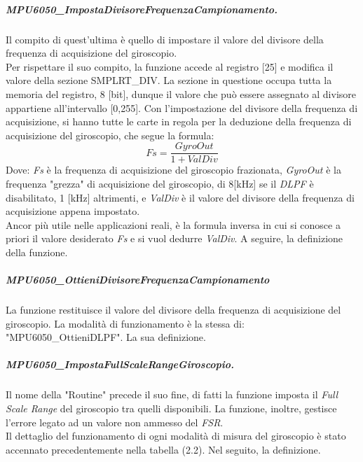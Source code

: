 \documentclass[11pt]{report}
\begin{document}
\subparagraph{MPU6050\_ImpostaDivisoreFrequenzaCampionamento.}
Il compito di quest'ultima è quello di impostare il valore del divisore della frequenza di acquisizione del giroscopio.\\
Per rispettare il suo compito, la funzione accede al registro [25] e modifica il valore della sezione SMPLRT\_DIV. La sezione in questione occupa tutta la memoria del registro, 8 [bit], dunque il valore che può essere assegnato al divisore appartiene all'intervallo [0,255].
Con l'impostazione del divisore della frequenza di acquisizione, si hanno tutte le carte in regola per la deduzione della frequenza di acquisizione del giroscopio, che segue la formula:
\begin{equation}
    Fs = \frac{GyroOut}{1 + ValDiv}
\end{equation}
Dove: \textit{Fs} è la frequenza di acquisizione del giroscopio frazionata, \textit{GyroOut} è la frequenza "grezza" di acquisizione del giroscopio, di 8[kHz] se il \textit{DLPF} è disabilitato, 1 [kHz] altrimenti, e \textit{ValDiv} è il valore del divisore della frequenza di acquisizione appena impostato.\\
Ancor più utile nelle applicazioni reali, è la formula inversa in cui si conosce a priori il valore desiderato \textit{Fs} e si vuol dedurre \textit{ValDiv}.
A seguire, la definizione della funzione.


\subparagraph{MPU6050\_OttieniDivisoreFrequenzaCampionamento}
La funzione restituisce il valore del divisore della frequenza di acquisizione del giroscopio. La modalità di funzionamento è la stessa di: "MPU6050\_OttieniDLPF".
La sua definizione.


\subparagraph{MPU6050\_ImpostaFullScaleRangeGiroscopio.}
Il nome della "Routine" precede il suo fine, di fatti la funzione imposta il \textit{Full Scale Range} del giroscopio tra quelli disponibili. La funzione, inoltre, gestisce l'errore legato ad un valore non ammesso del \textit{FSR}.\\
Il dettaglio del funzionamento di ogni modalità di misura del giroscopio è stato accennato precedentemente nella tabella (2.2).
Nel seguito, la definizione.

\end{document}

